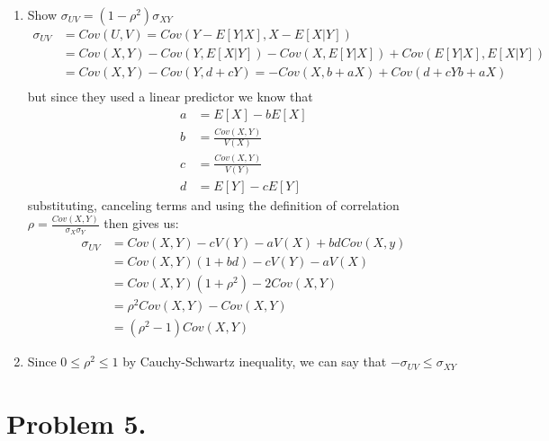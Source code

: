 \documentclass{article}
\newcommand{\1}{\mathbf{1}}
\begin{document}
\begin{enumerate}
    \item Show $\sigma_{UV} = (1 - \rho^2)\sigma_{XY}$
        \begin{align*}
            \sigma_{UV} &= Cov(U,V) = Cov(Y - E[Y|X], X-E[X|Y]) \\
            &= Cov(X, Y) - Cov(Y, E[X|Y]) - Cov(X, E[Y|X]) + Cov(E[Y|X], E[X|Y]) \\
            &= Cov(X,Y) - Cov(Y, d+cY) = - Cov(X, b+aX) + Cov(d+cY b+aX) \\
        \end{align*}
    but since they used a linear predictor we know that 
        \begin{align*}
            a &= E[X] - bE[X] \\
            b &=  \frac{Cov(X,Y)}{V(X)} \\
            c &= \frac{Cov(X,Y)}{V(Y)} \\
            d &= E[Y] - cE[Y]
        \end{align*}
    substituting, canceling terms and using the definition of correlation $\rho = \frac{Cov(X,Y)}{\sigma_X\sigma_Y}$ then gives us:
        \begin{align*}
            \sigma_{UV} &= Cov(X,Y) - cV(Y) - aV(X) + bdCov(X,y) \\
            &= Cov(X,Y)(1+bd) - cV(Y) - aV(X) \\
            &= Cov(X,Y)(1+\rho^2) - 2Cov(X,Y) \\
            &= \rho^2 Cov(X,Y) - Cov(X, Y) \\
            &= (\rho^2-1) Cov(X, Y)
        \end{align*}
        
    \item Since $0 \leq \rho^2 \leq 1$ by Cauchy-Schwartz inequality, we can say that $-\sigma_{UV} \leq \sigma_{XY}$
\end{enumerate}


\newpage
\section*{Problem 5.} 
\end{document}
